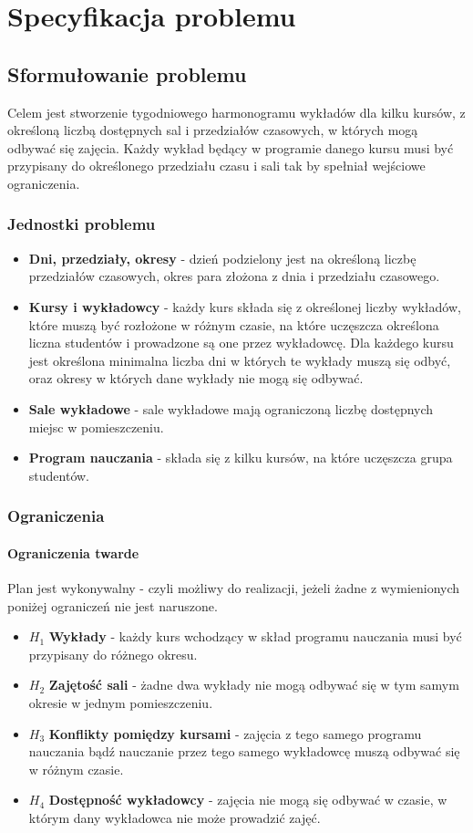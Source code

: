 \documentclass[11pt]{report}
\begin{document}
\chapter{Specyfikacja problemu}
\section{Sformułowanie problemu}
Celem jest stworzenie tygodniowego harmonogramu wykładów dla kilku kursów, z określoną liczbą dostępnych sal i przedziałów czasowych, w których mogą odbywać się zajęcia. Każdy wykład będący w programie danego kursu musi być przypisany do określonego przedziału czasu i sali tak by spełniał wejściowe ograniczenia. 
\subsection{Jednostki problemu}
\begin{itemize}
\item \textbf{Dni, przedziały, okresy} - dzień podzielony jest na określoną liczbę przedziałów czasowych, okres para złożona z dnia i przedziału czasowego.
\item \textbf{Kursy i wykładowcy} - każdy kurs składa się z określonej liczby wykładów, które muszą być rozłożone w różnym czasie, na które uczęszcza określona liczna studentów i prowadzone są one przez wykładowcę. Dla każdego kursu jest określona minimalna liczba dni w których te wykłady muszą się odbyć, oraz okresy w których dane wykłady nie mogą się odbywać.
\item \textbf{Sale wykładowe} - sale wykładowe mają ograniczoną liczbę dostępnych miejsc w pomieszczeniu.
\item \textbf{Program nauczania} - składa się z kilku kursów, na które uczęszcza grupa studentów.
\end{itemize}
\subsection{Ograniczenia}
\subsubsection{Ograniczenia twarde}
Plan jest wykonywalny - czyli możliwy do realizacji, jeżeli żadne z wymienionych poniżej ograniczeń nie jest naruszone.
\begin{itemize}
\item  ${H_{1}}$ \textbf{Wykłady} - każdy kurs wchodzący w skład programu nauczania musi być przypisany do różnego okresu.
\item  ${H_{2}}$ \textbf{Zajętość sali} - żadne dwa wykłady nie mogą odbywać się w tym samym okresie w jednym pomieszczeniu.
\item  ${H_{3}}$ \textbf{Konflikty pomiędzy kursami} - zajęcia z tego samego programu nauczania bądź nauczanie przez tego samego wykładowcę muszą odbywać się w różnym czasie.
\item  ${H_{4}}$ \textbf{Dostępność wykładowcy} - zajęcia nie mogą się odbywać w czasie, w którym dany wykładowca nie może prowadzić zajęć.
\end{itemize}
\end{document}

